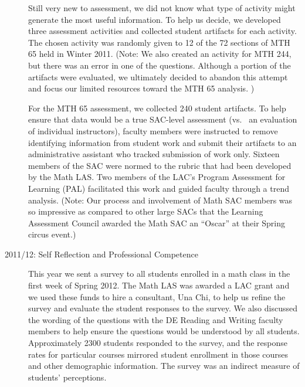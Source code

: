 \begin{description}
	      Still very new to assessment, we did not know what type of activity might generate the most useful information.
	      To help us decide, we developed three assessment activities and collected student artifacts for each activity.
	      The chosen activity was randomly given to 12 of the 72 sections of MTH 65 held in Winter 2011.
	      (Note: We also created an activity for MTH 244, but there was an
	      error in one of the questions.
	      Although a portion of the artifacts were evaluated, we ultimately decided to abandon this attempt and focus our limited resources toward the MTH 65 analysis.
	      )

	      For the MTH 65 assessment, we collected 240 student artifacts.
	      To help ensure that data would be a true SAC-level assessment (vs.
	      \ an evaluation of individual
	      instructors), faculty members were instructed to remove identifying information
	      from student work and submit their artifacts to an administrative assistant who
	      tracked submission of work only.
	      Sixteen members of the SAC were normed to the rubric that had been developed by the Math LAS.
	      Two members of the LAC's Program Assessment for Learning (PAL) facilitated this work and guided faculty through a trend analysis.
	      (Note: Our process and involvement of Math SAC
	      members was so impressive as compared to other large SACs that the Learning
	      Assessment Council awarded the Math SAC an ``Oscar'' at their Spring circus
	      event.)

	\item[2011/12: Self Reflection and Professional Competence]

	      This year we sent a survey to all students enrolled in a math class in the first week of Spring 2012.
	      The Math LAS was awarded a LAC grant and we used these funds to hire a consultant, Una Chi, to help us refine the survey and evaluate the student responses to the survey.
	      We also discussed the wording of the questions with the DE Reading and Writing faculty members to help ensure the questions would be understood by all students.
	      Approximately 2300 students responded to the survey, and the response rates for particular courses mirrored student enrollment in those courses and other demographic information.
	      The survey was an indirect measure of students' perceptions.


\end{description}
